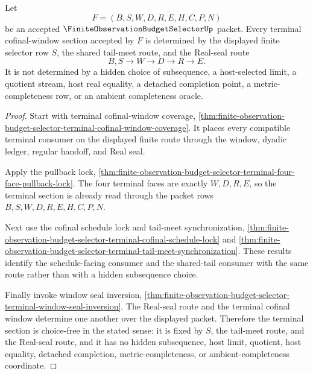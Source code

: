 \begin{theorem}
\label{thm:finite-observation-budget-selector-terminal-window-choice-free-section}
Let
$$
F=(B,S,W,D,R,E,H,C,P,N)
$$
be an accepted $\FiniteObservationBudgetSelectorUp$ packet. Every terminal cofinal-window section accepted by $F$ is determined by the displayed finite selector row $S$, the shared tail-meet route, and the Real-seal route
$$
B,S \to W \to D \to R \to E.
$$
It is not determined by a hidden choice of subsequence, a host-selected limit, a quotient stream, host real equality, a detached completion point, a metric-completeness row, or an ambient completeness oracle.
\end{theorem}
\begin{proof}
Start with terminal cofinal-window coverage, \autoref{thm:finite-observation-budget-selector-terminal-cofinal-window-coverage}. It places every compatible terminal consumer on the displayed finite route through the window, dyadic ledger, regular handoff, and Real seal.

Apply the pullback lock, \autoref{thm:finite-observation-budget-selector-terminal-four-face-pullback-lock}. The four terminal faces are exactly $W,D,R,E$, so the terminal section is already read through the packet rows $B,S,W,D,R,E,H,C,P,N$.

Next use the cofinal schedule lock and tail-meet synchronization, \autoref{thm:finite-observation-budget-selector-terminal-cofinal-schedule-lock} and \autoref{thm:finite-observation-budget-selector-terminal-tail-meet-synchronization}. These results identify the schedule-facing consumer and the shared-tail consumer with the same route rather than with a hidden subsequence choice.

Finally invoke window seal inversion, \autoref{thm:finite-observation-budget-selector-terminal-window-seal-inversion}. The Real-seal route and the terminal cofinal window determine one another over the displayed packet. Therefore the terminal section is choice-free in the stated sense: it is fixed by $S$, the tail-meet route, and the Real-seal route, and it has no hidden subsequence, host limit, quotient, host equality, detached completion, metric-completeness, or ambient-completeness coordinate.
\end{proof}


